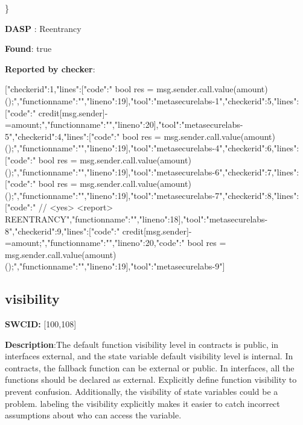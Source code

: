 \documentclass{article}
\begin{document}
\} 

\textbf{DASP} : Reentrancy

\textbf{Found}: true

\textbf{Reported by checker}: 
\begin{ffcode} 

[{"checker\textunderscore id":1,"lines":[{"code":"      bool res = msg.sender.call.value(amount)();\n","function\textunderscore name":"","line\textunderscore no":19}],"tool":"metasecurelabs-1"},{"checker\textunderscore id":5,"lines":[{"code":"      credit[msg.sender]-=amount;\n","function\textunderscore name":"","line\textunderscore no":20}],"tool":"metasecurelabs-5"},{"checker\textunderscore id":4,"lines":[{"code":"      bool res = msg.sender.call.value(amount)();\n","function\textunderscore name":"","line\textunderscore no":19}],"tool":"metasecurelabs-4"},{"checker\textunderscore id":6,"lines":[{"code":"      bool res = msg.sender.call.value(amount)();\n","function\textunderscore name":"","line\textunderscore no":19}],"tool":"metasecurelabs-6"},{"checker\textunderscore id":7,"lines":[{"code":"      bool res = msg.sender.call.value(amount)();\n","function\textunderscore name":"","line\textunderscore no":19}],"tool":"metasecurelabs-7"},{"checker\textunderscore id":8,"lines":[{"code":"      // <yes> <report> REENTRANCY\n","function\textunderscore name":"","line\textunderscore no":18}],"tool":"metasecurelabs-8"},{"checker\textunderscore id":9,"lines":[{"code":"      credit[msg.sender]-=amount;\n","function\textunderscore name":"","line\textunderscore no":20},{"code":"      bool res = msg.sender.call.value(amount)();\n","function\textunderscore name":"","line\textunderscore no":19}],"tool":"metasecurelabs-9"}]
\end{ffcode} 
\subsection{visibility} 
\textbf{SWC{\textunderscore }ID:} [100,108]

\textbf{Description}:The default function visibility level in contracts is public, in interfaces {\textendash} external,  and the state variable default visibility level is internal. In contracts, the fallback function can be external or public. In interfaces, all the functions should be declared as external. Explicitly define function visibility to prevent confusion.
Additionally, the visibility of state variables could be a problem. labeling the visibility explicitly makes it easier to catch incorrect assumptions about who can access the variable.
\end{document}
